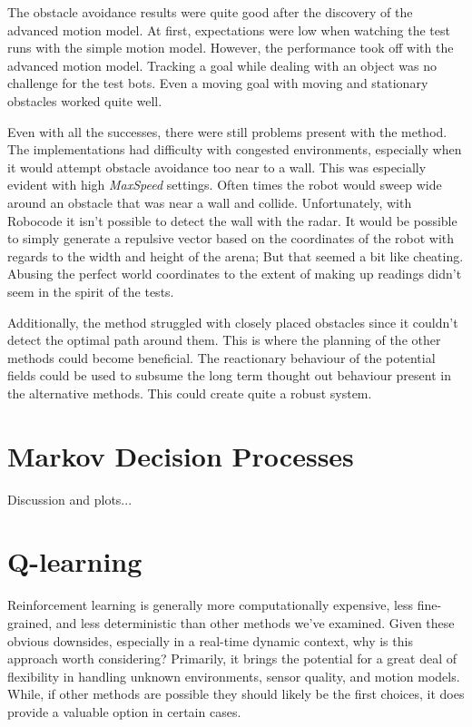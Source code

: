 \documentclass{aiaa-tc}%
\begin{document}
The obstacle avoidance results were quite good after the discovery of the advanced motion model. At first, expectations were low when watching the test runs with the simple motion model. However, the performance took off with the advanced motion model. Tracking a goal while dealing with an object was no challenge for the test bots. Even a moving goal with moving and stationary obstacles worked quite well.

Even with all the successes, there were still problems present with the method. The implementations had difficulty with congested environments, especially when it would attempt obstacle avoidance too near to a wall. This was especially evident with high \emph{MaxSpeed} settings. Often times the robot would sweep wide around an obstacle that was near a wall and collide. Unfortunately, with Robocode it isn't possible to detect the wall with the radar. It would be possible to simply generate a repulsive vector based on the coordinates of the robot with regards to the width and height of the arena; But that seemed a bit like cheating. Abusing the perfect world coordinates to the extent of making up readings didn't seem in the spirit of the tests.

Additionally, the method struggled with closely placed obstacles since it couldn't detect the optimal path around them. This is where the planning of the other methods could become beneficial. The reactionary behaviour of the potential fields could be used to subsume the long term thought out behaviour present in the alternative methods. This could create quite a robust system.

\section{Markov Decision Processes}
\label{Markov Decision Processes}
Discussion and plots...

\section{Q-learning}
\label{Q-learning}

Reinforcement learning is generally more computationally expensive,
less fine-grained, and less deterministic than other methods we've
examined. Given these obvious downsides, especially in a
real-time dynamic context, why is this approach worth
considering? Primarily, it brings the potential for a great deal of
flexibility in handling unknown environments, sensor quality, and
motion models. While, if other methods are possible they should likely
be the first choices, it does provide a valuable option in certain
cases.
\end{document}
